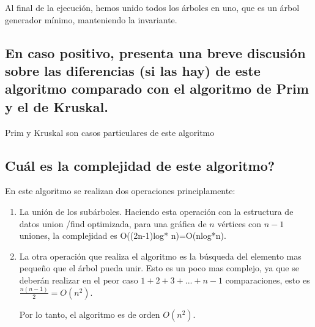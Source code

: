 \documentclass[9pt,spanish]{article}
\numberwithin{equation}{section}
\begin{document}
Al final de la ejecución, hemos unido todos los árboles en uno, que es un árbol generador mínimo, manteniendo la invariante.


\subsection*{En caso positivo, presenta una breve discusi\'on sobre las diferencias (si las hay) de este algoritmo comparado con el algoritmo de Prim y el de Kruskal.}

Prim y Kruskal son casos particulares de este algoritmo

\subsection*{Cuál es la complejidad de este algoritmo?}

En este algoritmo se realizan dos operaciones principlamente:
\begin{enumerate}
\item La uni\'on de los sub\'arboles.  Haciendo esta operaci\'on con la estructura de datos union /find optimizada, para una gr\'afica de $n$  v\'ertices con $n-1$ uniones, la complejidad es O((2n-1)log* n)=O(nlog*n).
\item La otra operaci\'on que realiza el algoritmo es la b\'usqueda del elemento mas peque\~no que el \'arbol pueda unir.  Esto es un poco mas complejo, ya que se deber\'an realizar en el peor caso $1 + 2 + 3 +...+n-1$ comparaciones, esto es $\frac{n(n-1)}{2}=O(n^2)$.

Por lo tanto, el algoritmo es de orden $O(n^2).$



\end{enumerate}
\end{document}
